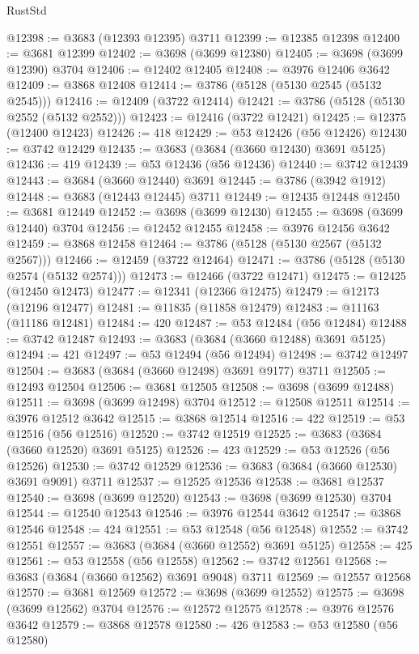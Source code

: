 \begin{lexlean}{RustStd}
\begin{coremodule}
@12398 := @3683 (@12393 @12395) @3711
@12399 := @12385 @12398
@12400 := @3681 @12399
@12402 := @3698 (@3699 @12380)
@12405 := @3698 (@3699 @12390) @3704
@12406 := @12402 @12405
@12408 := @3976 @12406 @3642
@12409 := @3868 @12408
@12414 := @3786 (@5128 (@5130 @2545 (@5132 @2545)))
@12416 := @12409 (@3722 @12414)
@12421 := @3786 (@5128 (@5130 @2552 (@5132 @2552)))
@12423 := @12416 (@3722 @12421)
@12425 := @12375 (@12400 @12423)
@12426 := 418
@12429 := @53 @12426 (@56 @12426)
@12430 := @3742 @12429
@12435 := @3683 (@3684 (@3660 @12430) @3691 @5125)
@12436 := 419
@12439 := @53 @12436 (@56 @12436)
@12440 := @3742 @12439
@12443 := @3684 (@3660 @12440) @3691
@12445 := @3786 (@3942 @1912)
@12448 := @3683 (@12443 @12445) @3711
@12449 := @12435 @12448
@12450 := @3681 @12449
@12452 := @3698 (@3699 @12430)
@12455 := @3698 (@3699 @12440) @3704
@12456 := @12452 @12455
@12458 := @3976 @12456 @3642
@12459 := @3868 @12458
@12464 := @3786 (@5128 (@5130 @2567 (@5132 @2567)))
@12466 := @12459 (@3722 @12464)
@12471 := @3786 (@5128 (@5130 @2574 (@5132 @2574)))
@12473 := @12466 (@3722 @12471)
@12475 := @12425 (@12450 @12473)
@12477 := @12341 (@12366 @12475)
@12479 := @12173 (@12196 @12477)
@12481 := @11835 (@11858 @12479)
@12483 := @11163 (@11186 @12481)
@12484 := 420
@12487 := @53 @12484 (@56 @12484)
@12488 := @3742 @12487
@12493 := @3683 (@3684 (@3660 @12488) @3691 @5125)
@12494 := 421
@12497 := @53 @12494 (@56 @12494)
@12498 := @3742 @12497
@12504 := @3683 (@3684 (@3660 @12498) @3691 @9177) @3711
@12505 := @12493 @12504
@12506 := @3681 @12505
@12508 := @3698 (@3699 @12488)
@12511 := @3698 (@3699 @12498) @3704
@12512 := @12508 @12511
@12514 := @3976 @12512 @3642
@12515 := @3868 @12514
@12516 := 422
@12519 := @53 @12516 (@56 @12516)
@12520 := @3742 @12519
@12525 := @3683 (@3684 (@3660 @12520) @3691 @5125)
@12526 := 423
@12529 := @53 @12526 (@56 @12526)
@12530 := @3742 @12529
@12536 := @3683 (@3684 (@3660 @12530) @3691 @9091) @3711
@12537 := @12525 @12536
@12538 := @3681 @12537
@12540 := @3698 (@3699 @12520)
@12543 := @3698 (@3699 @12530) @3704
@12544 := @12540 @12543
@12546 := @3976 @12544 @3642
@12547 := @3868 @12546
@12548 := 424
@12551 := @53 @12548 (@56 @12548)
@12552 := @3742 @12551
@12557 := @3683 (@3684 (@3660 @12552) @3691 @5125)
@12558 := 425
@12561 := @53 @12558 (@56 @12558)
@12562 := @3742 @12561
@12568 := @3683 (@3684 (@3660 @12562) @3691 @9048) @3711
@12569 := @12557 @12568
@12570 := @3681 @12569
@12572 := @3698 (@3699 @12552)
@12575 := @3698 (@3699 @12562) @3704
@12576 := @12572 @12575
@12578 := @3976 @12576 @3642
@12579 := @3868 @12578
@12580 := 426
@12583 := @53 @12580 (@56 @12580)

\end{coremodule}
\end{lexlean}

